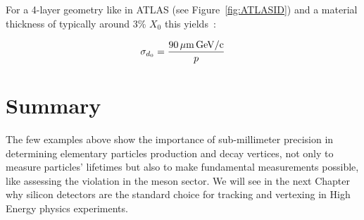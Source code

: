 For a 4-layer geometry like in ATLAS (see Figure~\ref{fig:ATLASID}) and a material thickness of 
typically around  3\% $X_0$ this yields~\cite{Garcia-Sciveres:2017ymt}:

\begin{equation}
\sigma_{d_{0}}=\dfrac{90\,\mu {\rm m\,GeV/c}}{p}
\end{equation}

\section{Summary}
The few examples above show the importance of sub-millimeter precision in determining elementary 
particles production  and decay vertices, not only to measure  particles' lifetimes but also 
to make fundamental measurements possible, like assessing the  \CP violation in the \B meson 
sector. We will see in the next Chapter why silicon detectors are the standard choice for tracking and 
vertexing in High Energy physics experiments.
